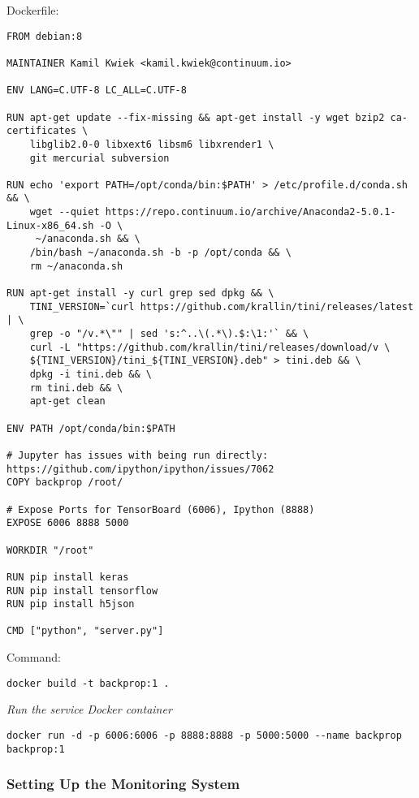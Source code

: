Dockerfile:
 \begin{lstlisting}
FROM debian:8

MAINTAINER Kamil Kwiek <kamil.kwiek@continuum.io>

ENV LANG=C.UTF-8 LC_ALL=C.UTF-8

RUN apt-get update --fix-missing && apt-get install -y wget bzip2 ca-certificates \
    libglib2.0-0 libxext6 libsm6 libxrender1 \
    git mercurial subversion

RUN echo 'export PATH=/opt/conda/bin:$PATH' > /etc/profile.d/conda.sh && \
    wget --quiet https://repo.continuum.io/archive/Anaconda2-5.0.1-Linux-x86_64.sh -O \
     ~/anaconda.sh && \
    /bin/bash ~/anaconda.sh -b -p /opt/conda && \
    rm ~/anaconda.sh

RUN apt-get install -y curl grep sed dpkg && \
    TINI_VERSION=`curl https://github.com/krallin/tini/releases/latest | \
    grep -o "/v.*\"" | sed 's:^..\(.*\).$:\1:'` && \
    curl -L "https://github.com/krallin/tini/releases/download/v \
    ${TINI_VERSION}/tini_${TINI_VERSION}.deb" > tini.deb && \
    dpkg -i tini.deb && \
    rm tini.deb && \
    apt-get clean

ENV PATH /opt/conda/bin:$PATH

# Jupyter has issues with being run directly: https://github.com/ipython/ipython/issues/7062
COPY backprop /root/

# Expose Ports for TensorBoard (6006), Ipython (8888)
EXPOSE 6006 8888 5000

WORKDIR "/root"

RUN pip install keras
RUN pip install tensorflow
RUN pip install h5json

CMD ["python", "server.py"]
\end{lstlisting}

Command: 

 \begin{lstlisting}
docker build -t backprop:1 .
\end{lstlisting}


\emph{Run the service Docker container}
 \begin{lstlisting}
docker run -d -p 6006:6006 -p 8888:8888 -p 5000:5000 --name backprop backprop:1
\end{lstlisting}







\subsubsection{Setting Up the Monitoring System}\label{Monitoring System setup}

